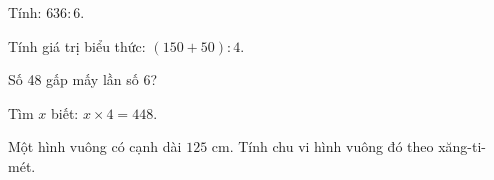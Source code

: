 \begin{ex} %
Tính: $636 : 6$.
\end{ex}

\begin{ex} %
Tính giá trị biểu thức: $(150 + 50) : 4$.
\end{ex}

\begin{ex} %
Số 48 gấp mấy lần số 6?
\end{ex}

\begin{ex} %
Tìm $x$ biết: $x \times 4 = 448$.
\end{ex}

\begin{ex} %
Một hình vuông có cạnh dài $125\text{ cm}$. Tính chu vi hình vuông đó theo xăng-ti-mét.
\end{ex}
